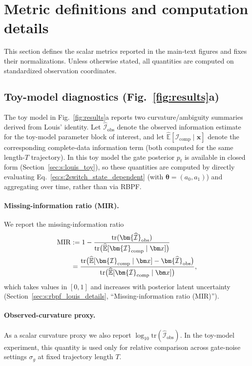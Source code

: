 \documentclass[twoside]{article}
\theoremstyle{plain}
\theoremstyle{definition}
\theoremstyle{remark}
\newcommand{\E}{\mathbb{E}}
\newcommand{\tr}{\mathrm{tr}}
\newcommand{\Ic}{\bm{\mathcal{I}}_{\mathrm{comp}}}
\newcommand{\Iohat}{\bm{\widehat{\mathcal{I}}}_{\mathrm{obs}}}
\begin{document}
\section{Metric definitions and computation details}
\label{sec:s:repro_and_metrics}
This section defines the scalar metrics reported in the main-text figures and fixes their normalizations. Unless otherwise stated, all quantities are computed on standardized observation coordinates.

\subsection{Toy-model diagnostics (Fig.~\ref{fig:results}a)}
The toy model in Fig.~\ref{fig:results}a reports two curvature/ambiguity summaries derived from Louis' identity.
Let $\Iohat$ denote the observed information estimate for the toy-model parameter block of interest, and let $\widehat{\E}[\Ic\mid \bm x]$ denote the corresponding complete-data information term (both computed for the same length-$T$ trajectory). In this toy model the gate posterior $p_t$ is available in closed form (Section~\ref{sec:s:louis_toy}), so these quantities are computed by directly evaluating Eq.~\eqref{eq:s:2switch_state_dependent} (with $\bm\theta=(a_0,a_1)$) and aggregating over time, rather than via RBPF.

\paragraph{Missing-information ratio (MIR).}
We report the missing-information ratio
\begin{align}
\mathrm{MIR}
&:= 1-\frac{\tr(\Iohat)}{\tr\big(\widehat{\E}[\Ic\mid \bm x]\big)}\notag\\
&=\frac{\tr\big(\widehat{\E}[\Ic\mid \bm x]-\Iohat\big)}{\tr\big(\widehat{\E}[\Ic\mid \bm x]\big)},
\end{align}
which takes values in $[0,1]$ and increases with posterior latent uncertainty (Section~\ref{sec:s:rbpf_louis_details}, ``Missing-information ratio (MIR)'').

\paragraph{Observed-curvature proxy.}
As a scalar curvature proxy we also report $\log_{10}\tr(\Iohat)$. In the toy-model experiment, this quantity is used only for relative comparison across gate-noise settings $\sigma_g$ at fixed trajectory length $T$.
\end{document}

